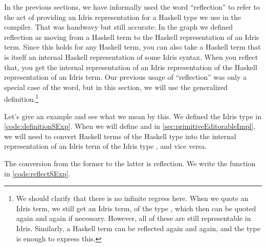 In the previous sections, we have informally used the word ``reflection'' to
refer to the act of providing an Idris representation for a Haskell type we use
in the compiler.  That was handwavy but still accurate: In the graph we defined
reflection as moving from a Haskell term to the Haskell representation of an
Idris term. Since this holds for any Haskell term, you can also take a Haskell
term that is itself an internal Haskell representation of some Idris syntax.
When you reflect that, you get the internal representation of an Idris
representation of the Haskell representation of an Idris term.  Our previous
usage of ``reflection'' was only a special case of the word, but in this
section, we will use the generalized definition.\footnote{We should clarify
that there is no infinite regress here. When we quote an Idris term, we still
get an Idris term, of the type , which then can be quoted again and
again if necessary. However, all of these are still representable in Idris.
Similarly, a Haskell term can be reflected again and again, and the 
type is enough to express this.}

Let's give an example and see what we mean by this.
We defined the Idris type  in \autoref{code:definitionSExp}.
When we will define  and  in \autoref{sec:primitiveEditorableImpl},
we will need to convert Haskell terms of the Haskell type  into the
internal representation of an Idris term of the Idris type , and vice
versa.

The conversion from the former to the latter is reflection. We write the
function  in \autoref{code:reflectSExp}.

